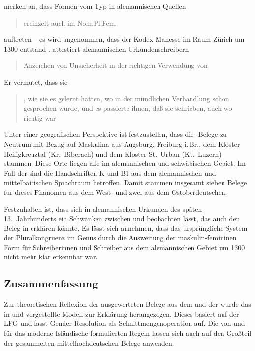 \cite[485]{ksw2} merken an, dass Formen vom Typ  in
alemannischen Quellen \blockquote{ereinzelt auch im
Nom.Pl.Fem.} auftreten -- es wird angenommen, dass der Kodex Manesse im Raum
Zürich um 1300 entstand \autocite[4957]{hsc}. 
attestiert alemannischen Urkundenschreibern
\blockquote{Anzeichen von Unsicherheit in der richtigen Verwendung von
}. Er vermutet, dass sie \blockcquote[28]{deboor1976b}{
, wie sie es gelernt hatten, wo in der mündlichen
Verhandlung schon  gesprochen wurde, und es passierte ihnen, daß sie
 schrieben, auch wo  richtig war}.

Unter einer geografischen Perspektive ist festzustellen, dass die \CAO{}-Belege
zu Neutrum mit Bezug auf Maskulina aus Augsburg, Freiburg i.\,Br., dem Kloster
Heiligkreuztal (Kr.~Biberach) und dem Kloster St.~Urban (Kt.~Luzern) stammen.
Diese Orte liegen alle im alemannischen und
schwäbischen Gebiet. Im Fall der \KC{} sind die Handschriften K
und B1 aus dem alemannischen und mittelbairischen
Sprachraum betroffen. Damit stammen insgesamt sieben Belege für dieses Phänomen
aus dem West- und zwei aus dem Ost\-ober\-deutschen.

Festzuhalten ist, dass sich in alemannischen Urkunden des
späten 13.~Jahrhunderts ein Schwanken zwischen  und 
beobachten lässt, das auch den Beleg in  erklären
könnte. Es lässt sich annehmen, dass das ursprüngliche System der
Pluralkongruenz im Genus durch die Ausweitung der maskulin-femininen Form für
Schreiberinnen und Schreiber aus dem alemannischen Gebiet um
1300 nicht mehr klar erkennbar war.

\subsection{Zusammenfassung}

Zur theoretischen Reflexion der ausgewerteten Belege aus dem \CAO{} und der
\KC{} wurde das in \citet{wechsler2009} und \citet{wechslerzlatic2003}
vorgestellte Modell zur Erklärung herangezogen. Dieses basiert auf der LFG und
fasst Gender Resolution als Schnittmengenoperation auf. Die von
\citet[578]{wechsler2009} und \citet[186]{wechslerzlatic2003} für das moderne
Isländische formulierten Regeln lassen sich auch auf den
Großteil der gesammelten mittelhochdeutschen Belege
anwenden.

